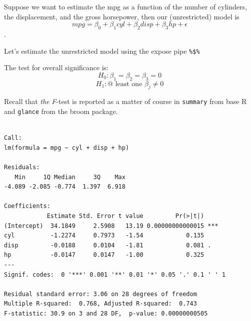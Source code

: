 \documentclass[]{book}
\newenvironment{Shaded}{\begin{snugshade}}{\end{snugshade}}
\newcommand{\KeywordTok}[1]{\textcolor[rgb]{0.13,0.29,0.53}{\textbf{#1}}}
\newcommand{\NormalTok}[1]{#1}
\newcommand{\OperatorTok}[1]{\textcolor[rgb]{0.81,0.36,0.00}{\textbf{#1}}}
\newcommand{\StringTok}[1]{\textcolor[rgb]{0.31,0.60,0.02}{#1}}
\begin{document}
Suppose we want to estimate the mpg as a function of the number of cylinders, the displacement, and the gross horsepower, then our (unrestricted) model is \[mpg=\beta_0+\beta_1cyl+\beta_2disp+\beta_3hp+\epsilon\].

Let's estimate the unrestricted model using the expose pipe \texttt{\%\$\%}

\begin{Shaded}
\end{Shaded}

The test for overall significance is: \[H_0:\beta_1=\beta_2=\beta_3=0\] \[H_1: \text{@ least one }\beta_j\ne0\]

Recall that \emph{the} \emph{F}-test is reported as a matter of course in \texttt{summary} from base R and \texttt{glance} from the broom package.

\begin{Shaded}
\end{Shaded}

\begin{verbatim}

Call:
lm(formula = mpg ~ cyl + disp + hp)

Residuals:
   Min     1Q Median     3Q    Max 
-4.089 -2.085 -0.774  1.397  6.918 

Coefficients:
            Estimate Std. Error t value         Pr(>|t|)    
(Intercept)  34.1849     2.5908   13.19 0.00000000000015 ***
cyl          -1.2274     0.7973   -1.54            0.135    
disp         -0.0188     0.0104   -1.81            0.081 .  
hp           -0.0147     0.0147   -1.00            0.325    
---
Signif. codes:  0 '***' 0.001 '**' 0.01 '*' 0.05 '.' 0.1 ' ' 1

Residual standard error: 3.06 on 28 degrees of freedom
Multiple R-squared:  0.768, Adjusted R-squared:  0.743 
F-statistic: 30.9 on 3 and 28 DF,  p-value: 0.00000000505
\end{verbatim}

\begin{Shaded}
\end{Shaded}
\end{document}
